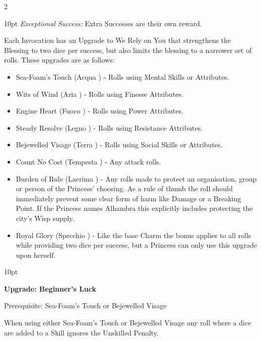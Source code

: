 \begin{multicols}{2}
\begin{myindentpar}{10pt}
        \emph{Exceptional Success:} Extra Successes are their own reward.\end{myindentpar}
		
\noindent Each Invocation has an Upgrade to We Rely on You that strengthens the Blessing to two dice per success, but also limits the blessing to a narrower set of rolls. These upgrades are as follows: 

\begin{itemize}
\item    Sea-Foam's Touch (Acqua \textbullet) - Rolls using Mental Skills or Attributes.

\item    Wits of Wind (Aria \textbullet) - Rolls using Finesse Attributes.

\item    Engine Heart (Fuoco \textbullet) - Rolls using  Power Attributes.

\item    Steady Resolve (Legno \textbullet) - Rolls using  Resistance Attributes.

\item    Bejewelled Visage (Terra \textbullet) - Rolls using Social Skills or Attributes.

\item    Count No Cost (Tempesta \textbullet) - Any attack rolls.

\item    Burden of Rule (Lacrima \textbullet) - Any rolls made to protect an organisation, group or person of the Princess' choosing. As a rule of thumb the roll should immediately prevent some clear form of harm like Damage or a Breaking Point. If the Princess names Alhambra this explicitly includes protecting the city's Wisp supply.

\item    Royal Glory (Specchio \textbullet) - Like the base Charm the bonus applies to all rolls while providing two dice per success, but a Princess can only use this upgrade upon herself. 

 \end{itemize}
 
 \begin{myindentpar}{10pt}
 
 \textbf{Upgrade: Beginner's Luck}
 
 Prerequisite: Sea-Foam's Touch or Bejewelled Visage
 
 When using either Sea-Foam's Touch or Bejewelled Visage any roll where a dice are added to a Skill ignores the Unskilled Penalty. 
 

\end{myindentpar}
\end{multicols}
